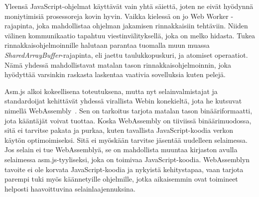 Yleensä JavaScript-ohjelmat käyttävät vain yhtä säiettä, joten ne eivät hyödynnä moniytimisiä prosessoreja kovin hyvin. Vaikka kielessä on jo Web Worker -rajapinta, joka mahdollistaa ohjelman jakamisen rinnakkaisiin tehtäviin. Niiden välinen kommunikaatio tapahtuu viestinvälityksellä, joka on melko hidasta. Tukea rinnakkaisohjelmoinnille halutaan parantaa tuomalla muun muassa \textit{SharedArrayBuffer}-rajapinta, eli jaettu taulukkopuskuri, ja atomiset operaatiot. Nämä yhdessä mahdollistavat matalan tason rinnakkaisohjelmoinnin, joka hyödyttää varsinkin raskasta laskentaa vaativia sovelluksia kuten pelejä.

Asm.js alkoi kokeellisena toteutuksena, mutta nyt selainvalmistajat ja standardoijat kehittävät yhdessä virallista Webin konekieltä, jota he kutsuvat nimellä WebAssembly~\cite{webassembly}. Sen on tarkoitus tarjota matalan tason binääriformaatti, jota kääntäjät voivat tuottaa. Koska WebAssembly on tiiviissä binäärimuodossa, sitä ei tarvitse pakata ja purkaa, kuten tavallista JavaScript-koodia verkon käytön optimoimiseksi. Sitä ei myöskään tarvitse jäsentää uudelleen selaimessa. Jos selain ei tue WebAssemblyä, se on mahdollista muuntaa kirjaston avulla selaimessa asm.js-tyyliseksi, joka on toimivaa JavaScript-koodia. WebAssemblyn tavoite ei ole korvata JavaScript-koodia ja nykyistä kehitystapaa, vaan tarjota parempi tuki myös käännetyille ohjelmille, jotka aikaisemmin ovat toimineet helposti haavoittuvina selainlaajennuksina.

